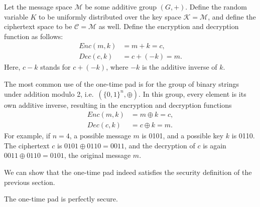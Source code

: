 \begin{definition}
Let the message space $\mathcal{M}$ be some additive group $(G,+)$. Define the random variable $K$ to be uniformly distributed over the key space $\mathcal{K} = \mathcal{M}$, and define the ciphertext space to be $\mathcal{C} = \mathcal{M}$ as well. Define the encryption and decryption function as follows:
\begin{align*}
Enc(m,k) &= m + k = c,\\
Dec(c,k) &= c + (-k) = m.
\end{align*}
Here, $c-k$ stands for $c + (-k)$, where $-k$ is the additive inverse of $k$.
\end{definition}
\begin{example}
The most common use of the one-time pad is for the group of binary strings under addition modulo 2, i.e.\ $(\{0,1\}^n, \oplus)$. In this group, every element is its own additive inverse, resulting in the encryption and decryption functions
\begin{align*}
Enc(m,k) &= m \oplus k = c,\\
Dec(c,k) &= c \oplus k = m.
\end{align*}
For example, if $n=4$, a possible message $m$ is 0101, and a possible key $k$ is 0110. The ciphertext $c$ is $0101 \oplus 0110 = 0011$, and the decryption of $c$ is again $0011 \oplus 0110 = 0101$, the original message $m$.
\end{example}
We can show that the one-time pad indeed satisfies the security definition of the previous section.
\begin{theorem}
The one-time pad is perfectly secure.
\end{theorem}
